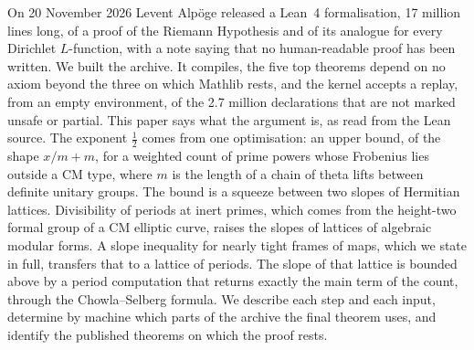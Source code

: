 On 20 November 2026 Levent Alp\"oge released a Lean~4 formalisation, 17 million lines long, of
a proof of the Riemann Hypothesis and of its analogue for every Dirichlet $L$-function, with a
note saying that no human-readable proof has been written. We built the archive. It compiles,
the five top theorems depend on no axiom beyond the three on which Mathlib rests, and the
kernel accepts a replay, from an empty environment, of the 2.7 million declarations that are
not marked unsafe or partial. This
paper says what the argument is, as read from the Lean source. The exponent $\tfrac12$ comes
from one optimisation: an upper bound, of the shape $x/m+m$, for a weighted count of prime
powers whose Frobenius lies outside a CM type, where $m$ is the length of a chain of theta
lifts between definite unitary groups. The bound is a squeeze between two slopes of Hermitian
lattices. Divisibility of periods at inert primes, which comes from the height-two formal group
of a CM elliptic curve, raises the slopes of lattices of algebraic modular forms. A slope
inequality for nearly tight frames of maps, which we state in full, transfers that to a lattice
of periods. The slope of that lattice is bounded above by a period computation that returns
exactly the main term of the count, through the Chowla--Selberg formula. We describe each step
and each input, determine by machine which parts of the archive the final theorem uses, and
identify the published theorems on which the proof rests.
